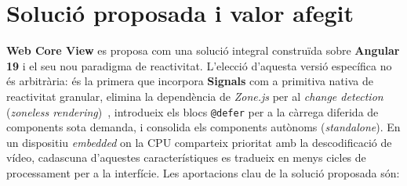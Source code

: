 \section{Solució proposada i valor afegit}
\label{sec:solucioproposada}
\textbf{Web Core View} es proposa com una solució integral construïda sobre \textbf{Angular 19} i el seu nou paradigma de reactivitat. L'elecció d'aquesta versió específica no és arbitrària: és la primera que incorpora \textbf{Signals} \cite{angular_signals} com a primitiva nativa de reactivitat granular, elimina la dependència de \textit{Zone.js} per al \textit{change detection} (\textit{zoneless rendering})~\cite{angular_zoneless}, introdueix els blocs \texttt{@defer} per a la càrrega diferida de components sota demanda, i consolida els components autònoms (\textit{standalone}). En un dispositiu \textit{embedded} on la CPU comparteix prioritat amb la descodificació de vídeo, cadascuna d'aquestes característiques es tradueix en menys cicles de processament per a la interfície. Les aportacions clau de la solució proposada són:
